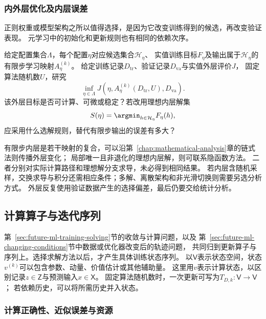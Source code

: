 \subsubsection{内外层优化及内层误差}
\label{sec:future-analysis-nested-learning}

正则权重或模型架构之所以值得选择，是因为它改变训练得到的候选，再改变验证表现。
元学习中的初始化和更新规则也有相同的依赖次序。

\begin{mathproblem}[通过内层学习进行外层优化]
  \label{question:future-nested-learning}
  给定配置集合$\Lambda$，每个配置$\eta$对应候选集合$\mathcal H_\eta$、
  实值训练目标$F_\eta$及输出属于$\mathcal H_\eta$的有限步学习映射$A_\eta^{(k)}$。
  给定训练记录$D_{\mathrm{tr}}$、验证记录$D_{\mathrm{va}}$与实值外层评价$J$，
  固定算法随机数$U$，研究
  \[
    \inf_{\eta\in\Lambda}
      J\!\left(\eta,A_\eta^{(k)}(D_{\mathrm{tr}},U),D_{\mathrm{va}}\right).
  \]
  该外层目标是否可计算、可微或稳定？若改用理想内层解集
  \[
    S(\eta)=\argmin_{h\in\mathcal H_\eta}F_\eta(h),
  \]
  应采用什么选解规则，替代有限步输出的误差有多大？
\end{mathproblem}

有限步内层是若干映射的复合，可以沿第~\ref{chap:mathematical-analysis}章的链式法则传播外层变化；
局部唯一且非退化的理想内层解，则可联系隐函数方法。
二者分别对实际计算路径和理想解分支求导，未必得到相同结果。
若内层含随机采样，交换求导与积分还需相应条件；多解、离散架构和非光滑切换则需要另选分析方式。
外层反复使用验证数据产生的选择偏差，最后仍要交给统计分析。

\subsection{计算算子与迭代序列}
\label{sec:future-iteration-object-map}

第~\ref{sec:future-ml-training-solving}节的收敛与计算问题，以及
第~\ref{sec:future-ml-changing-conditions}节中数据或优化器改变后的轨迹问题，
共同归到更新算子与序列上。选择求解方法以后，才产生具体训练状态序列。
以$\mathsf V$表示状态空间，状态$v^{(k)}$可以包含参数、动量、价值估计或其他辅助量。
这里用$v$表示计算状态，以区别记录$z\in\mathsf Z$与预测输入$x\in\mathsf X$。
固定算法随机数时，一次更新可写为$T_{D,k}:\mathsf V\to\mathsf V$；
若依赖历史，可以将所需历史并入状态。

\subsubsection{计算正确性、近似误差与资源}
\label{sec:future-analysis-computation}

